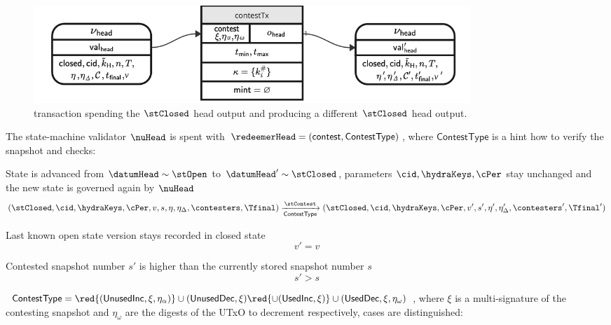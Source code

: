 \begin{figure}
  \includegraphics[width=0.8\textwidth]{Hydra/Protocol/Figures/contestTx.pdf}
  \caption{\mtxContest{} transaction spending the $\stClosed$ head output and
	producing a different $\stClosed$ head output.}\label{fig:contestTx}
\end{figure}

\noindent The state-machine validator $\nuHead$ is spent with
$\redeemerHead = (\mathsf{contest}, \mathsf{ContestType})$, where
$\mathsf{ContestType}$ is a hint how to verify the snapshot and checks:
\begin{menumerate}
  \item State is advanced from $\datumHead \sim \stOpen$ to
  $\datumHead' \sim \stClosed$, parameters $\cid,\hydraKeys,\cPer$
  stay unchanged and the new state is governed again by $\nuHead$
  \[
	(\stClosed,\cid,\hydraKeys,\cPer,v,s,\eta,\eta_{\Delta},\contesters,\Tfinal) \xrightarrow[\mathsf{ContestType}]{\stContest} (\stClosed,\cid,\hydraKeys,\cPer,v',s',\eta',\eta_{\Delta}',\contesters',\Tfinal')
  \]

  \item Last known open state version stays recorded in closed state
  \[
	v' = v
  \]

  \item Contested snapshot number $s'$ is higher than the currently stored snapshot number $s$
  \[
	s' > s
  \]
  \item $\mathsf{ContestType} = \red{(\mathsf{UnusedInc}, \xi, \eta_\alpha)} \cup (\mathsf{UnusedDec}, \xi) \red{\cup (\mathsf{UsedInc}, \xi)}  \cup (\mathsf{UsedDec}, \xi, \eta_\omega)$, where $\xi$ is a multi-signature of the contesting snapshot  and $\eta_\omega$ are the digests of the UTxO to  decrement respectively,  cases are distinguished:

  \begin{menumerate}
	\item {}


\end{menumerate}
\end{menumerate}
